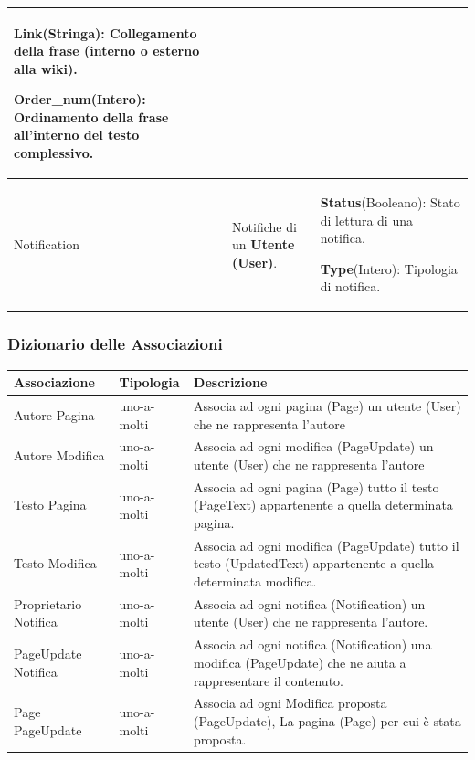 \documentclass{article}
\begin{document}
{\begin{table}[H]
\begin{tabularx}{\textwidth}{|l|X|X|}
				\textbf{Link}(Stringa): Collegamento della frase (interno o esterno alla wiki).
				
				\textbf{Order\_num}(Intero): Ordinamento della frase all'interno del testo complessivo.
				\\
				\hline
				Notification & Notifiche di un \textbf{Utente (User)}.& 
				\textbf{Status}(Booleano): Stato di lettura di una notifica.
				
				\textbf{Type}(Intero): Tipologia di notifica.
				\\
				\hline
				
			\end{tabularx}
			
		\end{table}
		
		{\subsubsection{Dizionario delle Associazioni}}
		
		\begin{table}[H]
			\centering
			\small %
			\setlength{\tabcolsep}{6pt} %
			\renewcommand{\arraystretch}{1.2} %
			
			
			\begin{tabularx}{\textwidth}{|l|l|X|}
				\hline
				\textbf{Associazione} &\textbf{Tipologia}  & \textbf{Descrizione} \\
				\hline
				Autore Pagina & uno-a-molti  & Associa ad ogni pagina (Page) un utente (User) che ne rappresenta l'autore
				\\
				\hline
				Autore Modifica & uno-a-molti  & Associa ad ogni modifica (PageUpdate) un utente (User) che ne rappresenta l'autore
				\\
				\hline
				Testo Pagina & uno-a-molti  & Associa ad ogni pagina (Page) tutto il testo (PageText) appartenente a quella determinata pagina.
				\\
				\hline
				Testo Modifica & uno-a-molti  & Associa ad ogni modifica (PageUpdate) tutto il testo (UpdatedText) appartenente a quella determinata modifica.
				\\
				\hline
				Proprietario Notifica & uno-a-molti  & Associa ad ogni notifica (Notification) un utente (User) che ne rappresenta l'autore.
				\\
				\hline
				PageUpdate Notifica & uno-a-molti  & Associa ad ogni notifica (Notification) una modifica (PageUpdate) che ne aiuta a rappresentare il contenuto.
				\\
				\hline
				Page PageUpdate & uno-a-molti  & Associa ad ogni Modifica proposta (PageUpdate), La pagina (Page) per cui \`e stata proposta. 
				\\
				\hline
			\end{tabularx}
		\end{table}
		
}
\end{document}
